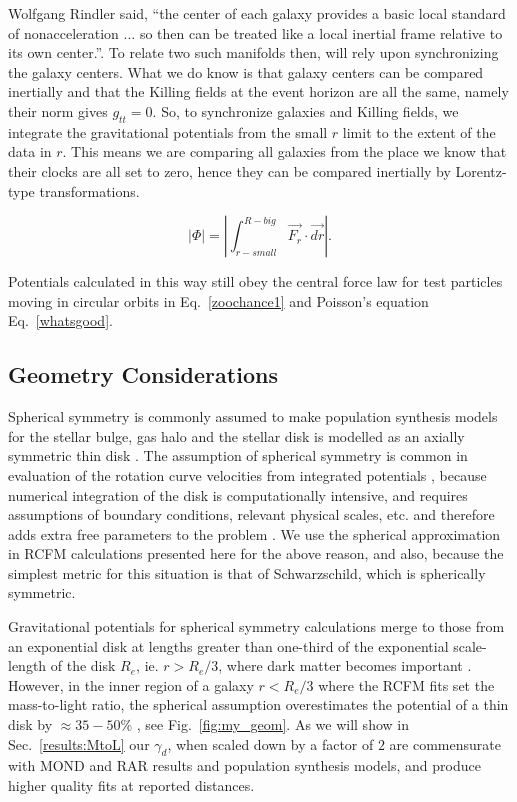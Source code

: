 \documentclass[reprint,%
 amsmath,amssymb,
 aps,
]{revtex4-1}
\begin{document}
  Wolfgang Rindler said,        ``the center of each galaxy provides a basic local standard of nonacceleration ... so then can be treated like a local inertial frame relative to its own center.''\cite{rindler2013essential}. To relate two such manifolds then, will rely upon synchronizing the galaxy centers. 
  What we do know is that galaxy centers can be compared inertially and that the Killing fields at the event horizon are all the same, namely their norm gives $g_{tt} = 0$. 
 So,  to synchronize galaxies and Killing fields, we   integrate the gravitational potentials from the small $r$ limit to the extent of the data in $r$. This means we are comparing all galaxies from the place we know that their clocks are all set to zero, hence they can be compared inertially by Lorentz-type transformations. 
   

 \begin{equation}
    | \Phi | = \left|  \int^{R-big}_{r-small} \vec{F_r}\cdot\vec{dr}\right|.
      \label{eq:Newt2}
      \end{equation}
 
 

   
 Potentials calculated in this way still obey the central force law for test particles moving in circular orbits in Eq.~\ref{zoochance1} and Poisson's equation Eq.~\ref{whatsgood}.
   
  
\subsection{  Geometry Considerations  }
  Spherical symmetry is commonly assumed to make  population synthesis models for the stellar bulge, gas halo and    the stellar disk is modelled as an axially symmetric thin disk \cite{1954AJ.....59..273S}.
 The assumption of spherical symmetry is common  in evaluation of the   rotation curve velocities from integrated potentials \cite{2022A&A...664A..40M,PhysRevD.70.083509}, because numerical integration of the disk is  computationally intensive, and requires assumptions of  boundary conditions,   relevant physical scales,  etc. and therefore adds extra free parameters to the problem \cite{2011A&A...531A..36H}.   We use the spherical approximation in RCFM calculations presented here for the above reason, and also, because  the simplest metric for this situation is that of 
 Schwarzschild, which is spherically symmetric. 
 
Gravitational potentials for   spherical  symmetry calculations merge to those from an exponential disk at lengths greater than one-third of the exponential scale-length of the disk $R_e$, ie.  $r> R_e/3$, where dark matter becomes important \cite{1985ApJAlbada}. 
However, 
    in the inner region of a galaxy $r< R_e/3$ 
    where the RCFM  fits set the mass-to-light ratio, the
   spherical assumption
    overestimates the potential of a thin disk by $\approx 35 - 50\%$ \cite{Chatterjee}, see Fig.~\ref{fig:my_geom}. As we will show in Sec.~\ref{results:MtoL} our $\gamma_d$, when scaled down by a factor of $2$ are commensurate with MOND and RAR results and population synthesis models, and produce higher quality fits at reported distances.  
    
\end{document}
